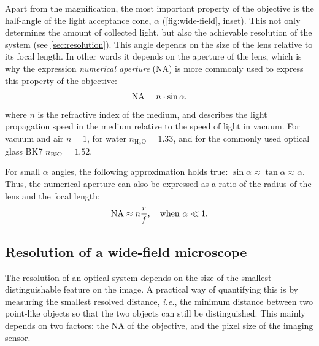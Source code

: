     Apart from the magnification, the most important property of the objective is the half-angle of the light acceptance cone, $\alpha$ (\autoref{fig:wide-field}, inset). This not only determines the amount of collected light, but also the achievable resolution of the system (see \autoref{sec:resolution}). This angle depends on the size of the lens relative to its focal length. In other words it depends on the aperture of the lens, which is why the expression \textit{numerical aperture} (NA) is more commonly used to express this property of the objective:
    \begin{equation}
      \operatorname{NA} = n\cdot \sin \alpha.
      \label{eq:NA}
    \end{equation}
    where $n$ is the refractive index of the medium, and describes the light propagation speed in the medium relative to the speed of light in vacuum. For vacuum and air $n=1$, for water $n_\mathrm{H_2O}=1.33$, and for the commonly used optical glass BK7 $n_\mathrm{BK7} = 1.52$.

    For small $\alpha$ angles, the following approximation holds true: $\sin \alpha \approx \tan \alpha \approx \alpha$. Thus, the numerical aperture can also be expressed as a ratio of the radius of the lens and the focal length:
    \begin{equation}
      \operatorname{NA} \approx n \frac{r}{f},\quad \text{when }\alpha \ll 1.
    \end{equation}



  \subsection{Resolution of a wide-field microscope}
    \label{sec:resolution}
    The resolution of an optical system depends on the size of the smallest distinguishable feature on the image. A practical way of quantifying this is by measuring the smallest resolved distance, \textit{i.e.}, the minimum distance between two point-like objects so that the two objects can still be distinguished. This mainly depends on two factors: the NA of the objective, and the pixel size of the imaging sensor.

